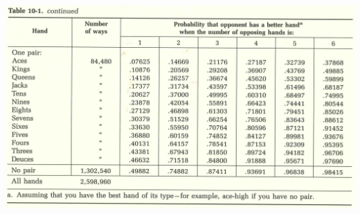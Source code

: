 \documentclass[9pt]{beamer}
\begin{document}
\begin{frame}[fragile,t]
\begin{center}
	\includegraphics[scale=0.25]{figs/Poker-2.png}
\end{center}
\end{frame}
\end{document}

